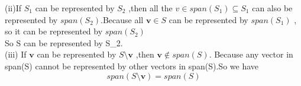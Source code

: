 \documentclass{article}
\begin{document}
  (ii)If $S_1$ can be represented by $S_2$ ,then all the $v\in span(S_1)\subseteq S_1$ can also be represented by $span(S_2)$.Because all $\mathbf{v}\in S$ can be represented by $span(S_1)$ , so it can be represented by $span(S_2)$ \\
  So S can be represented by S_2.\\

  (iii) If $\mathbf{v}$ can be represented by $S \setminus \mathbf{v}$ ,then $ \mathbf{v} \notin span(S)$. Because any vector in span(S) cannot be represented by other vectors in span(S).So we have \[span(S \setminus \mathbf{v}) = span(S)\]
\end{document}

